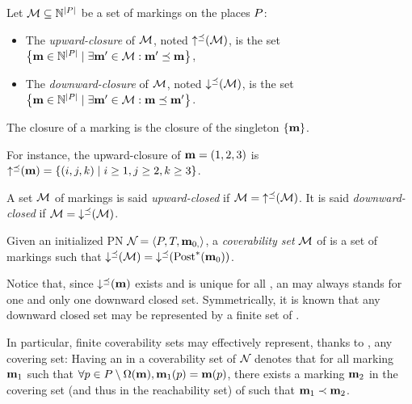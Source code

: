 \begin{defi}
  Let $\mathcal{M} \subseteq \mathbb{N}^{\left|P\right|}$ be a set of markings on the places $P$:
  \begin{itemize}
    \item The \emph{upward-closure} of $\mathcal{M}$, noted $\operatorname{\uparrow^\preceq}(\mathcal{M})$, is the set
      $\left\{\mathbf{m} \in \mathbb{N}^{\left|P\right|} \mid \exists \mathbf{m}' \in \mathcal{M} : \mathbf{m}' \preceq \mathbf{m}\right\}$,
    \item The \emph{downward-closure} of $\mathcal{M}$, noted $\operatorname{\downarrow^\preceq}(\mathcal{M})$, is the set
      $\left\{\mathbf{m} \in \mathbb{N}^{\left|P\right|} \mid \exists \mathbf{m}' \in \mathcal{M} : \mathbf{m} \preceq \mathbf{m}'\right\}$.
  \end{itemize}
  The closure of a marking \mar is the closure of the singleton $\{\mathbf{m}\}$.
\end{defi}

For instance, the upward-closure of $\mathbf{m} = (1, 2, 3)$ is $\operatorname{\uparrow^\preceq}(\mathbf{m}) = \left\{(i, j, k) \mid i \geq 1, j \geq 2, k \geq 3\right\}$.

\begin{defi}
  A set $\mathcal{M}$ of markings is said \emph{upward-closed} if $\mathcal{M} = \operatorname{\uparrow^\preceq}(\mathcal{M})$.
  It is said \emph{downward-closed} if $\mathcal{M} = \operatorname{\downarrow^\preceq}(\mathcal{M})$.
\end{defi}

\begin{defi}
  Given an initialized \ac{PN} $\mathcal{N}_{} = \left\langle P_{}, T_{}, \mathbf{m}_{0,}\right\rangle$, a \emph{coverability set} $\mathcal{M}$ of \namePN is a set of markings such that $\operatorname{\downarrow^\preceq}(\mathcal{M}) = \operatorname{\downarrow^\preceq}(\operatorname{Post}^*_{}(\mathbf{m}_0))$.
\end{defi}

Notice that, since $\operatorname{\downarrow^\preceq}(\mathbf{m})$ exists and is unique for all \omark \mar, an \omark may always stands for one and only one downward closed set.
Symmetrically, it is known that any downward closed set may be represented by a finite set of \omarks \citep{Geeraerts06}. 

In particular, finite coverability sets may effectively represent, thanks to \omarks, any covering set:
Having an \omark \mar in a coverability set of $\mathcal{N}_{}$ denotes that for all marking $\mathbf{m}_1$ such that $\forall p \in P \setminus \operatorname{\Omega}(\mathbf{m}), \mathbf{m}_1(p) = \mathbf{m}(p)$, there exists a marking $\mathbf{m}_2$ in the covering set (and thus in the reachability set) of \namePN such that $\mathbf{m}_1 \prec \mathbf{m}_2$.

